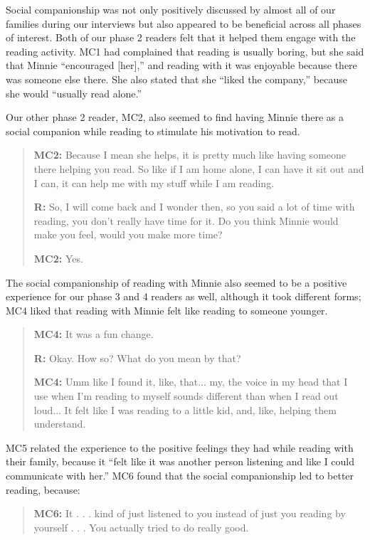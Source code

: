 \documentclass{sigchi}
\begin{document}
Social companionship was not only positively discussed by almost all of our families during our interviews but also appeared to be beneficial across all phases of interest. Both of our phase 2 readers felt that it helped them engage with the reading activity. MC1 had complained that reading is usually boring, but she said that Minnie ``encouraged [her],'' and reading with it was enjoyable because there was someone else there. She also stated that she ``liked the company,'' because she would ``usually read alone.''

Our other phase 2 reader, MC2, also seemed to find having Minnie there as a social companion while reading to stimulate his motivation to read.

	 \begin{quote}
		\textbf{MC2:} Because I mean she helps, it is pretty much like having someone there helping you read. So like if I am home alone, I can have it sit out and I can, it can help me with my stuff while I am reading. 
	
		\textbf{R:} So, I will come back and I wonder then, so you said a lot of time with reading, you don't really have time for it. Do you think Minnie would make you feel, would you make more time? 
		
		\textbf{MC2:} Yes. 
 	\end{quote}
 
The social companionship of reading with Minnie also seemed to be a positive experience for our phase 3 and 4 readers as well, although it took different forms; MC4 liked that reading with Minnie felt like reading to someone younger.
 
 \begin{quote}
 	 \textbf{MC4:} It was a fun change. 
 	 
 	 \textbf{R:} Okay. How so? What do you mean by that?
 	 
 	 \textbf{MC4:} Umm like I found it, like, that... my, the voice in my head that I use when I'm reading to myself sounds different than when I read out loud... It felt like I was reading to a little kid, and, like, helping them understand.
 	 \end{quote}
 	 
MC5 related the experience to the positive feelings they had while reading with their family, because it ``felt like it was another person listening and like I could communicate with her.'' MC6 found that the social companionship led to better reading, because:

	\begin{quote} 	
		 \textbf{MC6:} It . . . kind of just listened to you instead of just you reading by yourself . . . You actually tried to do really good.
	\end{quote}
 
\end{document}
